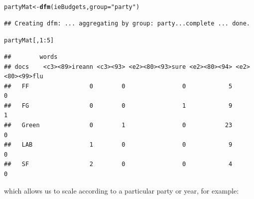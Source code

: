 \documentclass{article}\usepackage[]{graphicx}\usepackage[]{color}
\makeatletter
\newcommand{\hlnum}[1]{\textcolor[rgb]{0.686,0.059,0.569}{#1}}%
\newcommand{\hlstr}[1]{\textcolor[rgb]{0.192,0.494,0.8}{#1}}%
\newcommand{\hlopt}[1]{\textcolor[rgb]{0,0,0}{#1}}%
\newcommand{\hlstd}[1]{\textcolor[rgb]{0.345,0.345,0.345}{#1}}%
\newcommand{\hlkwb}[1]{\textcolor[rgb]{0.69,0.353,0.396}{#1}}%
\newcommand{\hlkwc}[1]{\textcolor[rgb]{0.333,0.667,0.333}{#1}}%
\newcommand{\hlkwd}[1]{\textcolor[rgb]{0.737,0.353,0.396}{\textbf{#1}}}%
\newenvironment{kframe}{%
 \def\at@end@of@kframe{}%
 \ifinner\ifhmode%
  \def\at@end@of@kframe{\end{minipage}}%
  \begin{minipage}{\columnwidth}%
 \fi\fi%
 \def\FrameCommand##1{\hskip\@totalleftmargin \hskip-\fboxsep
 \colorbox{shadecolor}{##1}\hskip-\fboxsep
     \hskip-\linewidth \hskip-\@totalleftmargin \hskip\columnwidth}%
 \MakeFramed {\advance\hsize-\width
   \@totalleftmargin\z@ \linewidth\hsize
   \@setminipage}}%
 {\par\unskip\endMakeFramed%
 \at@end@of@kframe}
\newenvironment{knitrout}{}{} %
\makeatother
\begin{document}
\begin{knitrout}
\color{fgcolor}\begin{kframe}
\begin{alltt}
\hlstd{partyMat} \hlkwb{<-} \hlkwd{dfm}\hlstd{(ieBudgets,} \hlkwc{group} \hlstd{=} \hlstr{"party"}\hlstd{)}
\end{alltt}
\begin{verbatim}
## Creating dfm: ... aggregating by group: party...complete ... done.
\end{verbatim}
\begin{alltt}
\hlstd{partyMat[,} \hlnum{1}\hlopt{:}\hlnum{5}\hlstd{]}
\end{alltt}
\begin{verbatim}
##        words
## docs    <c3><89>ireann <c3><93> <e2><80><93>sure <e2><80><94> <e2><80><99>flu
##   FF                 0        0                0            5               0
##   FG                 0        0                1            9               1
##   Green              0        1                0           23               0
##   LAB                1        0                0            9               0
##   SF                 2        0                0            4               0
\end{verbatim}
\end{kframe}
\end{knitrout}


which allows us to scale according to a particular party or year, for example:
\end{document}
